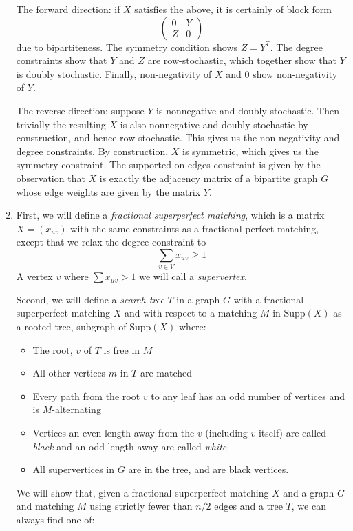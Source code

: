 \documentclass{hmcpset}
\begin{document}
\begin{solution}
\begin{enumerate}[label=(\Alph*)]
The forward direction: if $X$ satisfies the above, it is certainly of block form
\[\begin{pmatrix} 0 & Y \\ Z & 0\end{pmatrix}\]
due to bipartiteness. The symmetry condition shows $Z=Y^T$. The degree constraints show that $Y$ and $Z$ are row-stochastic, which together show that $Y$ is doubly stochastic. Finally, non-negativity of $X$ and $0$ show non-negativity of $Y$.

The reverse direction: suppose $Y$ is nonnegative and doubly stochastic. Then trivially the resulting $X$ is also nonnegative and doubly stochastic by construction, and hence row-stochastic. This gives us the non-negativity and degree constraints. By construction, $X$ is symmetric, which gives us the symmetry constraint. The supported-on-edges constraint is given by the observation that $X$ is exactly the adjacency matrix of a bipartite graph $G$ whose edge weights are given by the matrix $Y$.

\item
  
  
First, we will define a \emph{fractional superperfect matching}, which is a
matrix $X=(x_{uv})$ with the same constraints as a fractional perfect matching,
except that we relax the degree constraint to
\[\sum_{v\in V} x_{uv} \geq 1\]
A vertex $v$ where $\sum x_{uv} > 1$ we will call a \emph{supervertex}.

Second, we will define a \emph{search tree} $T$ in a graph $G$ with a fractional
superperfect matching $X$ and with respect to a matching $M$ in $\text{Supp}(X)$
as a rooted tree, subgraph of $\text{Supp}(X)$ where:

\begin{itemize}
\item The root, $v$ of $T$ is free in $M$
\item All other vertices $m$ in $T$ are matched
\item Every path from the root $v$ to any leaf has an odd number of vertices
      and is $M$-alternating
\item Vertices an even length away from the $v$ (including $v$ itself) are
      called \emph{black} and an odd length away are called \emph{white}
\item All supervertices in $G$ are in the tree, and are black vertices.
\end{itemize}

We will show that, given a fractional superperfect matching $X$ and a graph $G$
and matching $M$ using strictly fewer than $n/2$ edges and a tree $T$, we can always find
one of:


\end{enumerate}
\end{solution}
\end{document}
